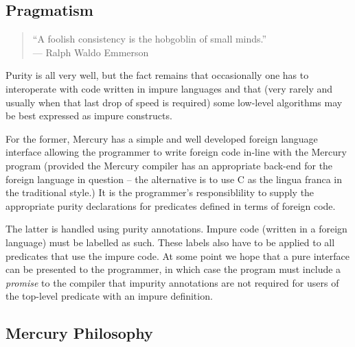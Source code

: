 
\subsection{Pragmatism}

\begin{quote}
``A foolish consistency is the hobgoblin of small minds.'' \\
\hfill --- Ralph Waldo Emmerson
\end{quote}

Purity is all very well, but the fact remains that
occasionally one has to interoperate with code written in
impure languages and that (very rarely and usually when that
last drop of speed is required) some low-level algorithms may
be best expressed as impure constructs.

For the former, Mercury has a simple and well developed
foreign language interface allowing the programmer to write
foreign code in-line with the Mercury program (provided the
Mercury compiler has an appropriate back-end for the foreign
language in question -- the alternative is to use C as the
lingua franca in the traditional style.)  It is the
programmer's responsiblility to supply the appropriate purity
declarations for predicates defined in terms of foreign code.

The latter is handled using purity annotations.  Impure code
(written in a foreign language) must be labelled as such.
These labels also have to be applied to all predicates that
use the impure code.  At some point we hope that a pure
interface can be presented to the programmer, in which case
the program must include a \emph{promise} to the compiler that
impurity annotations are not required for users of the
top-level predicate with an impure definition.

\subsection{Mercury Philosophy}




